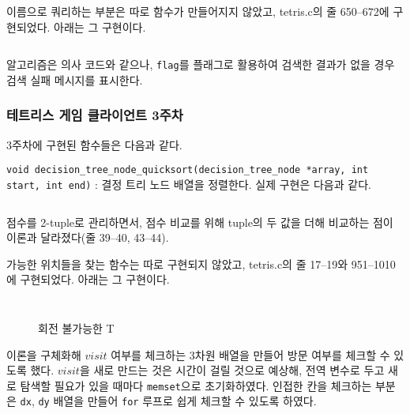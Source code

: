 \inputminted[xleftmargin=\parindent,linenos,firstline=181,lastline=197]{c}{inc-sources/ordered-list.c}

이름으로 쿼리하는 부분은 따로 함수가 만들어지지 않았고, tetris.c의 줄 650--672에 구현되었다. 아래는 그 구현이다.

\inputminted[xleftmargin=\parindent,linenos,firstline=650,lastline=672]{c}{inc-sources/tetris.c}

알고리즘은 의사 코드와 같으나, \texttt{flag}를 플래그로 활용하여 검색한 결과가 없을 경우 검색 실패 메시지를 표시한다.

\subsubsection{테트리스 게임 클라이언트 3주차} 3주차에 구현된 함수들은 다음과 같다.

\texttt{void decision_tree_node_quicksort(decision_tree_node *array, int start, int end)}
: 결정 트리 노드 배열을 정렬한다. 실제 구현은 다음과 같다.

\inputminted[xleftmargin=\parindent,linenos,firstline=32,lastline=51]{c}{inc-sources/decision-tree.c}

점수를 2-tuple로 관리하면서, 점수 비교를 위해 tuple의 두 값을 더해 비교하는 점이 이론과 달라졌다(줄 39--40, 43--44).

가능한 위치들을 찾는 함수는 따로 구현되지 않았고, tetris.c의 줄 17--19와 951--1010에 구현되었다. 아래는 그 구현이다.

\inputminted[xleftmargin=\parindent,linenos,firstline=17,lastline=19]{c}{inc-sources/tetris.c}

\inputminted[xleftmargin=\parindent,linenos,firstline=951,lastline=1010]{c}{inc-sources/tetris.c}

\begin{wrapfigure}{l}{0.3\textwidth}
\caption{회전 불가능한 T}
\label{fig:impossible}
\end{wrapfigure}

이론을 구체화해 $visit$ 여부를 체크하는 3차원 배열을 만들어 방문 여부를 체크할 수 있도록 했다. $visit$을 새로 만드는 것은 시간이 걸릴 것으로 예상해,
전역 변수로 두고 새로 탐색할 필요가 있을 때마다 \texttt{memset}으로 초기화하였다. 인접한 칸을 체크하는 부분은 \texttt{dx}, \texttt{dy} 배열을
만들어 \texttt{for} 루프로 쉽게 체크할 수 있도록 하였다.

